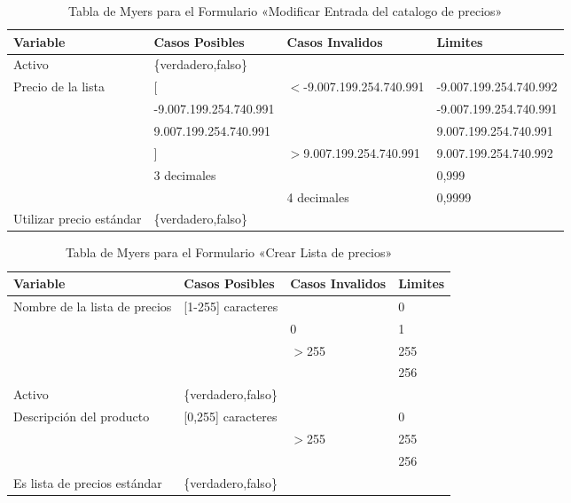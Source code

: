 \begin{table}
\centering
\begin{tabular}{|p{3.0cm}|p{4.0cm}|p{4.0cm}|l|}
\hline
\footnotesize{\textbf{Variable}} & \footnotesize{\textbf{Casos Posibles}} & \footnotesize{\textbf{Casos Invalidos}} & \footnotesize{\textbf{Limites}} \\
\hline
\footnotesize{Activo} & \footnotesize{\{verdadero,falso\}} & & \\
\hline
\footnotesize{Precio de la lista} & \footnotesize{[} & \footnotesize{$<$-9.007.199.254.740.991} & \footnotesize{-9.007.199.254.740.992} \\
& \footnotesize{-9.007.199.254.740.991} & & \footnotesize{-9.007.199.254.740.991} \\
& \footnotesize{9.007.199.254.740.991} & & \footnotesize{9.007.199.254.740.991} \\
& \footnotesize{]} & \footnotesize{$>$9.007.199.254.740.991} & \footnotesize{9.007.199.254.740.992} \\
& \footnotesize{3 decimales} & & \footnotesize{0,999} \\
& & \footnotesize{4 decimales} & \footnotesize{0,9999} \\
\hline
\footnotesize{Utilizar precio estándar} & \footnotesize{\{verdadero,falso\}} & & \\
\hline
\end{tabular}
\caption{Tabla de Myers para el Formulario «Modificar Entrada del catalogo de precios»}
\label{myers_04}
\end{table}

\begin{table}
\centering
\begin{tabular}{|p{6.0cm}|l|l|l|}
\hline
\footnotesize{\textbf{Variable}} & \footnotesize{\textbf{Casos Posibles}} & \footnotesize{\textbf{Casos Invalidos}} & \footnotesize{\textbf{Limites}} \\
\hline
\footnotesize{Nombre de la lista de precios} & \footnotesize{[1-255] caracteres} & & \footnotesize{0} \\
& & \footnotesize{0} & \footnotesize{1} \\
& & \footnotesize{$>$255} & \footnotesize{255} \\
& & & \footnotesize{256} \\
\hline
\footnotesize{Activo} & \footnotesize{\{verdadero,falso\}} & & \\
\hline
\footnotesize{Descripción del producto} & \footnotesize{[0,255] caracteres} & & \footnotesize{0} \\
& & \footnotesize{$>$255} & \footnotesize{255} \\
& & & \footnotesize{256} \\
\hline
\footnotesize{Es lista de precios estándar} & \footnotesize{\{verdadero,falso\}} & & \\
\hline
\end{tabular}
\caption{Tabla de Myers para el Formulario «Crear Lista de precios»}
\label{myers_05}
\end{table}

